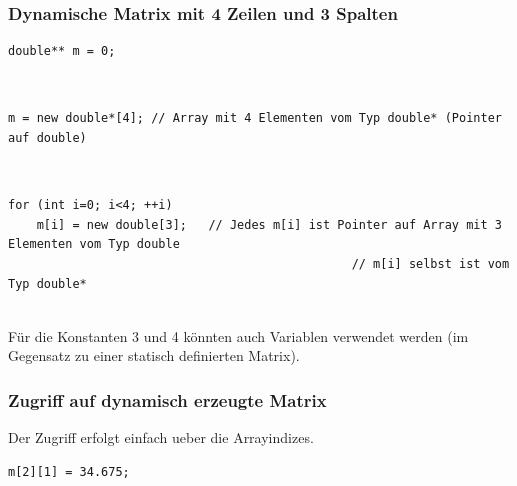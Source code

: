 \subsubsection{Dynamische Matrix mit 4 Zeilen und 3 Spalten}
\begin{minipage}{0.2\linewidth}
\begin{lstlisting}
double** m = 0;
\end{lstlisting}
\end{minipage}%
\hspace{0.1\linewidth}
\begin{minipage}{0.6\linewidth}
	
\end{minipage}\\
\begin{minipage}{\linewidth}
\vspace{-\baselineskip}
\begin{lstlisting}
m = new double*[4];	// Array mit 4 Elementen vom Typ double* (Pointer auf double)
\end{lstlisting}
\end{minipage}
\begin{minipage}{0.6\linewidth}
	\centering
	
\end{minipage}\\
\vspace{\baselineskip}
\begin{minipage}{\linewidth}
\begin{lstlisting}
for (int i=0; i<4; ++i)	
	m[i] = new double[3];	// Jedes m[i] ist Pointer auf Array mit 3 Elementen vom Typ double
												// m[i] selbst ist vom Typ double*	
\end{lstlisting}
\end{minipage}
\begin{minipage}{\linewidth}
	\centering
	
\end{minipage}\\
\vspace{\baselineskip}
Für die Konstanten 3 und 4 könnten auch Variablen verwendet werden (im Gegensatz zu einer statisch definierten Matrix).

\subsubsection{Zugriff auf dynamisch erzeugte Matrix}
Der Zugriff erfolgt einfach ueber die Arrayindizes.\\
\noindent
\begin{minipage}{0.25\linewidth}
\begin{lstlisting}
m[2][1] = 34.675;
\end{lstlisting}
\end{minipage}%
\hspace{0.1\linewidth}
\begin{minipage}{0.5\linewidth}
	
\end{minipage}
\vfill\null
\pagebreak


